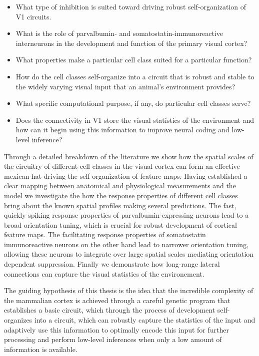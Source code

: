 \begin{itemize}
\item What type of inhibition is suited toward driving robust
  self-organization of V1 circuits.
\item What is the role of parvalbumin- and somatostatin-immunoreactive
  interneurons in the development and function of the primary visual cortex?
\item What properties make a particular cell class suited for a
  particular function?
\item How do the cell classes self-organize into a circuit that is
  robust and stable to the widely varying visual input that an animal's
  environment provides?
\item What specific computational purpose, if any, do particular cell
  classes serve?
\item Does the connectivity in V1 store the visual statistics of the
  environment and how can it begin using this information to improve
  neural coding and low-level inference?
\end{itemize}

Through a detailed breakdown of the literature we show how the spatial
scales of the circuitry of different cell classes in the visual cortex
can form an effective mexican-hat driving the self-organization of
feature maps. Having established a clear mapping between anatomical
and physiological measurements and the model we investigate the how
the response properties of different cell classes bring about the
known spatial profiles making several predictions. The fast, quickly
spiking response properties of parvalbumin-expressing neurons lead to
a broad orientation tuning, which is crucial for robust development of
cortical feature maps. The facilitating response properties of
somatostatin immunoreactive neurons on the other hand lead to narrower
orientation tuning, allowing these neurons to integrate over large
spatial scales mediating orientation dependent suppression. Finally we
demonstrate how long-range lateral connections can capture the visual
statistics of the environement.

The guiding hypothesis of this thesis is the idea that the incredible
complexity of the mammalian cortex is achieved through a careful
genetic program that establishes a basic circuit, which through the
process of development self-organizes into a circuit, which can
robustly capture the statistics of the input and adaptively use this
information to optimally encode this input for further processing and
perform low-level inferences when only a low amount of information is
available.


